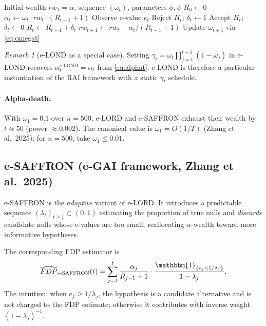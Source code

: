 \documentclass[11pt,a4paper,twocolumn]{article}
\theoremstyle{plain}
\theoremstyle{definition}
\theoremstyle{remark}
\newtheorem{remark}[theorem]{Remark}
\newcommand{\ind}{\mathbbm{1}}
\begin{document}
\begin{algorithm*}
\caption{e-LORD}
\label{alg:elord}
\begin{algorithmic}[1]
\Require Initial wealth $rw_1 = \alpha$, sequence $(\omega_t)$, parameters $\phi, \psi$
\State $R_0 \leftarrow 0$
    \State $\alpha_t \leftarrow \omega_t \cdot rw_t \cdot (R_{t-1} + 1)$
    \State Observe e-value $e_t$
        \State Reject $H_t$; $\delta_t \leftarrow 1$
    \Else
        \State Accept $H_t$; $\delta_t \leftarrow 0$
    \EndIf
    \State $R_t \leftarrow R_{t-1} + \delta_t$
    \State $rw_{t+1} \leftarrow rw_t - \alpha_t/(R_{t-1}+1)$
    \State Update $\omega_{t+1}$ via \eqref{eq:omegat}
\EndFor
\end{algorithmic}
\end{algorithm*}

\begin{remark}[e-LOND as a special case]
Setting $\gamma_t = \omega_t \prod_{j=1}^{t-1}(1 - \omega_j)$ in e-LOND
recovers $\alpha_t^{\text{e-LOND}} = \alpha_t$ from \eqref{eq:alphat}. e-LOND
is therefore a particular instantiation of the RAI framework with a static
$\gamma_t$ schedule.
\end{remark}


\paragraph{Alpha-death.}
With $\omega_1 = 0.1$ over $n = 500$, e-LORD and e-SAFFRON exhaust their
wealth by $t \approx 50$ (power $\approx 0.002$). The canonical value is
$\omega_1 = O(1/T)$ (Zhang et al.\ 2025): for $n = 500$, take
$\omega_1 \leq 0.01$.

\subsection{e-SAFFRON (e-GAI framework, Zhang et al.\ 2025)}
\label{sec:esaffron}

e-SAFFRON is the \emph{adaptive} variant of e-LORD. It introduces a
predictable sequence $(\lambda_t)_{t \geq 1} \subset (0,1)$ estimating the
proportion of true nulls and \emph{discards} candidate nulls whose e-values
are too small, reallocating $\alpha$-wealth toward more informative
hypotheses.

The corresponding FDP estimator is
\[
  \widehat{FDP}_{\text{e-SAFFRON}}(t)
    = \sum_{j=1}^{t} \frac{\alpha_j}{R_{j-1} + 1}
      \cdot \frac{\ind_{\{e_j < 1/\lambda_j\}}}{1 - \lambda_j}.
\]
The intuition: when $e_j \geq 1/\lambda_j$, the hypothesis is a candidate
alternative and is not charged to the FDP estimate; otherwise it contributes
with inverse weight $(1 - \lambda_j)^{-1}$.
\end{document}
